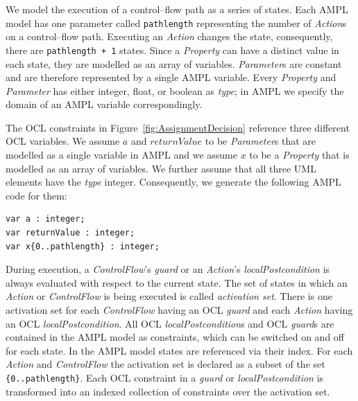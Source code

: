 \documentclass[runningheads,a4paper]{llncs}%
\newcommand{\UMLType}[1]{\textsf{\textit{#1}}} %
\newcommand{\UMLReference}[1]{\textsf{\textit{#1}}} %
\newcommand{\AMPLCode}[1]{\texttt{#1}}
\begin{document}
We model the execution of a control--flow path as a series of states. Each AMPL
model has one parameter called \AMPLCode{pathlength} representing the number of
\UMLType{Action}s on a control--flow path. Executing an \UMLType{Action} changes
the state, consequently, there are \AMPLCode{pathlength + 1} states. Since a
\UMLType{Property} can have a distinct value in each state, they are modelled as
an array of variables. \UMLType{Parameter}s are constant and are therefore
represented by a single AMPL variable. Every \UMLType{Property} and
\UMLType{Parameter} has either integer, float, or boolean as
\UMLReference{type}; in AMPL we specify the domain of an AMPL variable
correspondingly.

The OCL constraints in Figure~\ref{fig:AssignmentDecision} reference three
different OCL variables. We assume $a$ and $returnValue$ to be
\UMLType{Parameter}s that are modelled as a single variable in AMPL and we
assume $x$ to be a \UMLType{Property} that is modelled as an array of variables.
We further assume that all three UML elements have the \UMLReference{type}
integer. Consequently, we generate the following AMPL code for them: %
\begin{lstlisting}[basicstyle=\ttfamily,language=ampl]
var a : integer;
var returnValue : integer;
var x{0..pathlength} : integer;
\end{lstlisting}%

During execution, a \UMLType{ControlFlow}'s \UMLReference{guard} or an
\UMLType{Action}'s \UMLReference{localPostcondition} is always evaluated with
respect to the current state. The set of states in which an \UMLType{Action} or
\UMLType{ControlFlow} is being executed is called \emph{activation set}. There
is one activation set for each \UMLType{ControlFlow} having an OCL
\UMLReference{guard} and each \UMLType{Action} having an OCL
\UMLReference{localPostcondition}. All OCL \UMLReference{localPostcondition}s
and OCL \UMLReference{guard}s are contained in the AMPL model as constraints,
which can be switched on and off for each state. In the AMPL model states are
referenced via their index. For each \UMLType{Action} and \UMLType{ControlFlow}
the activation set is declared as a subset of the set
\AMPLCode{\{0..pathlength\}}. Each OCL constraint in a \UMLReference{guard} or
\UMLReference{localPostcondition} is transformed into an indexed collection of
constraints over the activation set.
\end{document}
